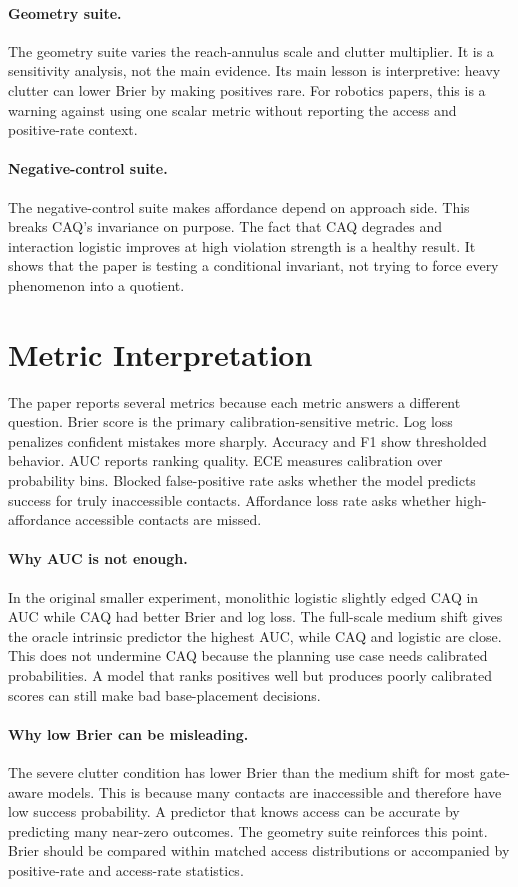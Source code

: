 \documentclass{article}
\begin{document}
\paragraph{Geometry suite.}
The geometry suite varies the reach-annulus scale and clutter multiplier. It is a sensitivity analysis, not the main evidence. Its main lesson is interpretive: heavy clutter can lower Brier by making positives rare. For robotics papers, this is a warning against using one scalar metric without reporting the access and positive-rate context.

\paragraph{Negative-control suite.}
The negative-control suite makes affordance depend on approach side. This breaks CAQ's invariance on purpose. The fact that CAQ degrades and interaction logistic improves at high violation strength is a healthy result. It shows that the paper is testing a conditional invariant, not trying to force every phenomenon into a quotient.

\section{Metric Interpretation}

The paper reports several metrics because each metric answers a different question. Brier score is the primary calibration-sensitive metric. Log loss penalizes confident mistakes more sharply. Accuracy and F1 show thresholded behavior. AUC reports ranking quality. ECE measures calibration over probability bins. Blocked false-positive rate asks whether the model predicts success for truly inaccessible contacts. Affordance loss rate asks whether high-affordance accessible contacts are missed.

\paragraph{Why AUC is not enough.}
In the original smaller experiment, monolithic logistic slightly edged CAQ in AUC while CAQ had better Brier and log loss. The full-scale medium shift gives the oracle intrinsic predictor the highest AUC, while CAQ and logistic are close. This does not undermine CAQ because the planning use case needs calibrated probabilities. A model that ranks positives well but produces poorly calibrated scores can still make bad base-placement decisions.

\paragraph{Why low Brier can be misleading.}
The severe clutter condition has lower Brier than the medium shift for most gate-aware models. This is because many contacts are inaccessible and therefore have low success probability. A predictor that knows access can be accurate by predicting many near-zero outcomes. The geometry suite reinforces this point. Brier should be compared within matched access distributions or accompanied by positive-rate and access-rate statistics.
\end{document}

